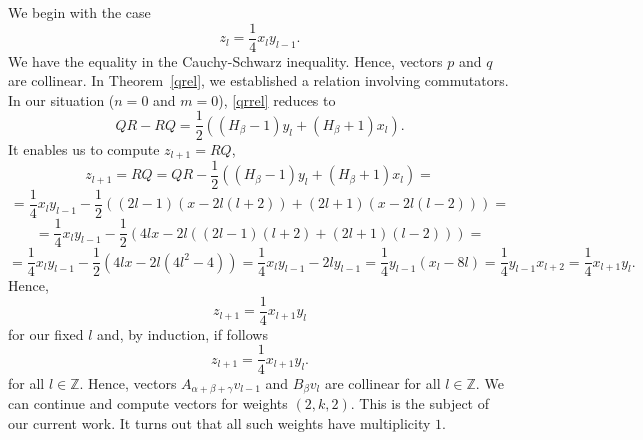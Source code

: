 \documentclass[twoside,a4paper,12pt]{article}
\newcommand{\Z}{\ensuremath{\mathbb Z}}
\theoremstyle{definition}
\begin{document}
We begin with the case
\begin{equation*}
	z_l=\frac14x_ly_{l-1}.
\end{equation*}
We have the equality in the Cauchy-Schwarz inequality. Hence, vectors $p$ and
$q$ are collinear. In Theorem~\ref{qrel}, we established a relation involving
commutators. In our situation ($n=0$ and $m=0$), \eqref{qrrel} reduces to
\begin{equation*}
	QR-RQ=\frac12\left((H_\beta-1)y_l+(H_\beta+1)x_l\right).
\end{equation*}
It enables us to compute $z_{l+1}=RQ$,
\begin{equation*}
	z_{l+1}=RQ=QR-\frac12\left((H_\beta-1)y_l+(H_\beta+1)x_l\right)=
\end{equation*}
\begin{equation*}
	=\frac14x_ly_{l-1}
	-\frac12\left((2l-1)(x-2l(l+2))+(2l+1)(x-2l(l-2))\right)=
\end{equation*}
\begin{equation*}
	=\frac14x_ly_{l-1}
	-\frac12\left(4lx-2l((2l-1)(l+2)+(2l+1)(l-2))\right)=
\end{equation*}
\begin{equation*}
	=\frac14x_ly_{l-1}-\frac12\left(4lx-2l(4l^2-4)\right)
	=\frac14x_ly_{l-1}-2ly_{l-1}
	=\frac14y_{l-1}\left(x_l-8l\right)
	=\frac14y_{l-1}x_{l+2}=\frac14x_{l+1}y_l.
\end{equation*}
Hence,
\begin{equation*}
	z_{l+1}=\frac14x_{l+1}y_l
\end{equation*}
for our fixed $l$ and, by induction, if follows
\begin{equation*}
	z_{l+1}=\frac14x_{l+1}y_l.
\end{equation*}
for all $l\in\Z$.
Hence, vectors $A_{\alpha+\beta+\gamma}v_{l-1}$ and $B_\beta v_l$ are collinear
for all $l\in\Z$.
We can continue and compute vectors for weights $(2,k,2)$.
This is the subject of our current work.
It turns out that all such weights have multiplicity $1$.
\end{document}

